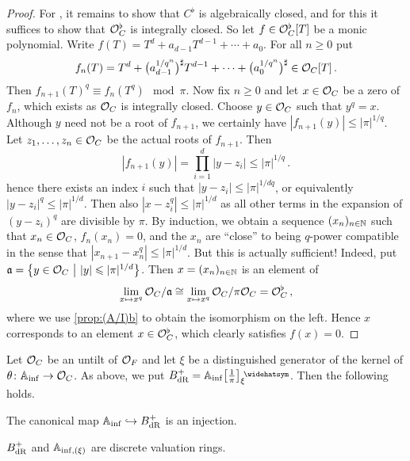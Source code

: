 \documentclass[a4paper, 10pt, oneside, DIV=9, chapterprefix=true, numbers=enddot,bibliography=totoc]{scrbook}
\begin{document}
\begin{proof}
	
	For , it remains to show that $C^\flat$ is algebraically closed, and for this it suffices to show that $\mathcal{O}_C^\flat$ is integrally closed. So let $f\in \mathcal{O}_C^\flat[T]$ be a monic polynomial. Write $f(T)=T^d+a_{d-1}T^{d-1}+\dotsb+a_0$. For all $n\geq 0$ put
	\begin{equation*}
		f_n(T)=T^d+\big(a_{d-1}^{1/q^n}\big)^\sharp T^{d-1}+\dotsb+\big(a_0^{1/q^n}\big)^\sharp\in \mathcal{O}_C[T]\,.
	\end{equation*}
	Then $f_{n+1}(T)^q\equiv f_n(T^q)\mod \pi$. Now fix $n\geq 0$ and let $x\in \mathcal{O}_C$ be a zero of $f_n$, which exists as $\mathcal{O}_C$ is integrally closed. Choose $y\in \mathcal{O}_C$ such that $y^q=x$. Although $y$ need not be a root of $f_{n+1}$, we certainly have $|f_{n+1}(y)|\leq |\pi|^{1/q}$. Let $z_1,\dotsc,z_n\in \mathcal{O}_C$ be the actual roots of $f_{n+1}$. Then
	\begin{equation*}
		|f_{n+1}(y)|=\prod_{i=1}^d|y-z_i|\leq |\pi|^{1/q}\,.
	\end{equation*}
	hence there exists an index $i$ such that $|y-z_i|\leq |\pi|^{1/dq}$, or equivalently $|y-z_i|^q\leq |\pi|^{1/d}$. Then also $|x-z_i^q|\leq |\pi|^{1/d}$ as all other terms in the expansion of $(y-z_i)^q$ are divisible by $\pi$. By induction, we obtain a sequence $(x_n)_{n\in \mathbb{N}}$ such that $x_n\in\mathcal{O}_C$, $f_n(x_n)=0$, and the $x_n$ are \enquote{close} to being $q$-power compatible in the sense that $|x_{n+1}-x_n^q|\leq |\pi|^{1/d}$. But this is actually sufficient! Indeed, put $\mathfrak{a}=\left\{y\in \mathcal{O}_C\ \middle|\  |y|\leqslant |\pi|^{1/d}\right\}$. Then $x=(x_n)_{n\in\mathbb{N}}$ is an element of
	\begin{equation*}
		\lim_{x\mapsto x^q}\mathcal{O}_C/\mathfrak{a}\cong \lim_{x\mapsto x^q}\mathcal{O}_C/\pi\mathcal{O}_C=\mathcal{O}_C^\flat\,,
	\end{equation*}
	where we use \cref{prop:(A/I)b} to obtain the isomorphism on the left. Hence $x$ corresponds to an element $x\in \mathcal{O}_C^\flat$, which clearly satisfies $f(x)=0$.
\end{proof}
\begin{lem}\label{lem:BdR+DVR}
	Let $\mathcal{O}_C$ be an untilt of $\mathcal{O}_F$ and let $\xi$ be a distinguished generator of the kernel of $\theta\colon \IA_\inf\morphism\Oo_C$. As above, we put $B_\dR^+=\IA_\inf\localize{\pi}_\xi^\complete$. Then the following holds.
	\begin{numerate}
		\item The canonical map $\IA_\inf\monomorphism B_\dR^+$ is an injection.
		\item $B_{\mathrm{dR}}^+$ and $\mathbb{A}_{\mathrm{inf},(\xi)}$ are discrete valuation rings.
	\end{numerate}
\end{lem}
\end{document}
